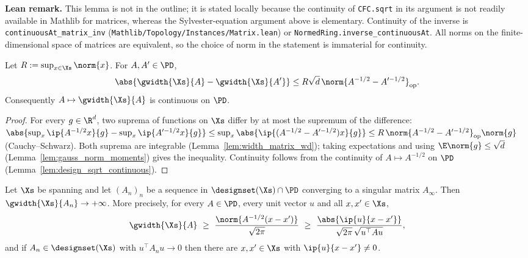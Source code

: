 \textbf{Lean remark.} This lemma is not in the outline; it is stated locally because the
continuity of \texttt{CFC.sqrt} in its argument is not readily available in Mathlib for
matrices, whereas the Sylvester-equation argument above is elementary. Continuity of the inverse
is \texttt{continuousAt\_matrix\_inv} (\texttt{Mathlib/Topology/Instances/Matrix.lean}) or
\texttt{NormedRing.inverse\_continuousAt}. All norms on the finite-dimensional space of matrices
are equivalent, so the choice of norm in the statement is immaterial for continuity.

\begin{lemma}\label{lem:width_matrix_continuous}
Let $R := \sup_{x\in\Xs}\norm{x}$. For $A, A' \in \PD$,
\[
  \abs{\gwidth{\Xs}{A} - \gwidth{\Xs}{A'}} \le R\sqrt d\,\norm{A^{-1/2} - A'^{-1/2}}_{\mathrm{op}} .
\]
Consequently $A \mapsto \gwidth{\Xs}{A}$ is continuous on $\PD$.
\end{lemma}

\begin{proof}
For every $g \in \R^d$, two suprema of functions on $\Xs$ differ by at most the supremum of the
difference:
$\abs{\sup_x\ip{A^{-1/2}x}{g} - \sup_x\ip{A'^{-1/2}x}{g}} \le \sup_x\abs{\ip{(A^{-1/2} - A'^{-1/2})x}{g}}
\le R\,\norm{A^{-1/2} - A'^{-1/2}}_{\mathrm{op}}\norm{g}$ (Cauchy--Schwarz). Both suprema are
integrable (Lemma~\ref{lem:width_matrix_wd}); taking expectations and using
$\E\norm{g} \le \sqrt d$ (Lemma~\ref{lem:gauss_norm_moments}) gives the inequality. Continuity
follows from the continuity of $A \mapsto A^{-1/2}$ on $\PD$
(Lemma~\ref{lem:design_sqrt_continuous}).
\end{proof}

\begin{lemma}\label{lem:width_coercive}
Let $\Xs$ be spanning and let $(A_n)_n$ be a sequence in $\designset(\Xs) \cap \PD$ converging to a singular matrix
$A_\infty$. Then $\gwidth{\Xs}{A_n} \to +\infty$. More precisely, for every $A \in \PD$, every
unit vector $u$ and all $x, x' \in \Xs$,
\[
  \gwidth{\Xs}{A} \ \ge\ \frac{\norm{A^{-1/2}(x - x')}}{\sqrt{2\pi}}
  \ \ge\ \frac{\abs{\ip{u}{x - x'}}}{\sqrt{2\pi}\,\sqrt{u^\top A u}} ,
\]
and if $A_n \in \designset(\Xs)$ with $u^\top A_n u \to 0$ then there are $x, x' \in \Xs$ with
$\ip{u}{x - x'} \ne 0$.
\end{lemma}

